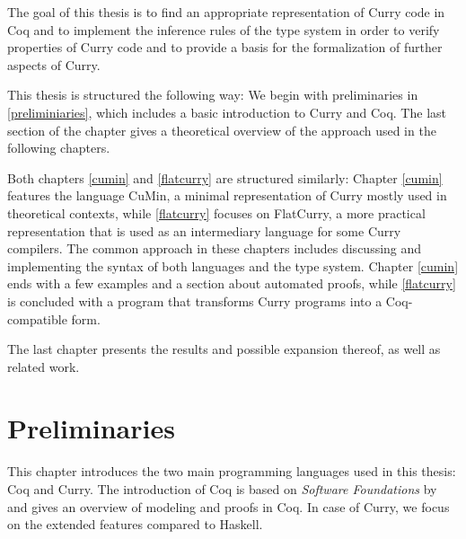 \documentclass[paper = a4, fleqn, twoside]{scrreprt}
\begin{document}
The goal of this thesis is to find an appropriate representation of Curry code in Coq and to implement the inference rules of the type system in order to verify properties of Curry code and to provide a basis for the formalization of further aspects of Curry.\\
\par \noindent
This thesis is structured the following way: We begin with preliminaries in \autoref{preliminiaries}, which includes a basic introduction to Curry and Coq. The last section of the chapter gives a theoretical overview of the approach used in the following chapters.\\
\par \noindent
Both chapters \ref{cumin} and \ref{flatcurry} are structured similarly: Chapter \ref{cumin} features the language CuMin, a minimal representation of Curry mostly used in theoretical contexts, while \autoref{flatcurry} focuses on FlatCurry, a more practical representation that is used as an intermediary language for some Curry compilers.
The common approach in these chapters includes discussing and implementing the syntax of both languages and the type system. Chapter \ref{cumin} ends with a few examples and a section about automated proofs, while \autoref{flatcurry} is concluded with a program that transforms Curry programs into a Coq-compatible form.\\
\par \noindent
The last chapter presents the results and possible expansion thereof, as well as related work. 
\chapter{Preliminaries}
\label{preliminiaries}
This chapter introduces the two main programming languages used in this thesis: Coq and Curry. The introduction of Coq is based on \textit{Software Foundations} by \citet{Pierce:SF} and gives an overview of modeling and proofs in Coq. In case of Curry, we focus on the extended features compared to Haskell.
\end{document}

